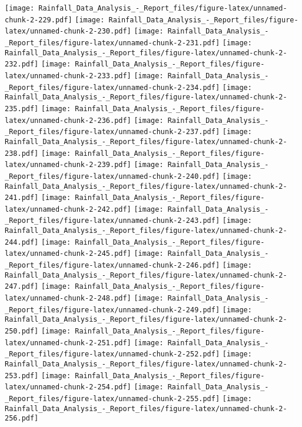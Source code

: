 \documentclass[
]{article}
\begin{document}
\texttt{[image: Rainfall\_Data\_Analysis\_-\_Report\_files/figure-latex/unnamed-chunk-2-229.pdf]}
\texttt{[image: Rainfall\_Data\_Analysis\_-\_Report\_files/figure-latex/unnamed-chunk-2-230.pdf]}
\texttt{[image: Rainfall\_Data\_Analysis\_-\_Report\_files/figure-latex/unnamed-chunk-2-231.pdf]}
\texttt{[image: Rainfall\_Data\_Analysis\_-\_Report\_files/figure-latex/unnamed-chunk-2-232.pdf]}
\texttt{[image: Rainfall\_Data\_Analysis\_-\_Report\_files/figure-latex/unnamed-chunk-2-233.pdf]}
\texttt{[image: Rainfall\_Data\_Analysis\_-\_Report\_files/figure-latex/unnamed-chunk-2-234.pdf]}
\texttt{[image: Rainfall\_Data\_Analysis\_-\_Report\_files/figure-latex/unnamed-chunk-2-235.pdf]}
\texttt{[image: Rainfall\_Data\_Analysis\_-\_Report\_files/figure-latex/unnamed-chunk-2-236.pdf]}
\texttt{[image: Rainfall\_Data\_Analysis\_-\_Report\_files/figure-latex/unnamed-chunk-2-237.pdf]}
\texttt{[image: Rainfall\_Data\_Analysis\_-\_Report\_files/figure-latex/unnamed-chunk-2-238.pdf]}
\texttt{[image: Rainfall\_Data\_Analysis\_-\_Report\_files/figure-latex/unnamed-chunk-2-239.pdf]}
\texttt{[image: Rainfall\_Data\_Analysis\_-\_Report\_files/figure-latex/unnamed-chunk-2-240.pdf]}
\texttt{[image: Rainfall\_Data\_Analysis\_-\_Report\_files/figure-latex/unnamed-chunk-2-241.pdf]}
\texttt{[image: Rainfall\_Data\_Analysis\_-\_Report\_files/figure-latex/unnamed-chunk-2-242.pdf]}
\texttt{[image: Rainfall\_Data\_Analysis\_-\_Report\_files/figure-latex/unnamed-chunk-2-243.pdf]}
\texttt{[image: Rainfall\_Data\_Analysis\_-\_Report\_files/figure-latex/unnamed-chunk-2-244.pdf]}
\texttt{[image: Rainfall\_Data\_Analysis\_-\_Report\_files/figure-latex/unnamed-chunk-2-245.pdf]}
\texttt{[image: Rainfall\_Data\_Analysis\_-\_Report\_files/figure-latex/unnamed-chunk-2-246.pdf]}
\texttt{[image: Rainfall\_Data\_Analysis\_-\_Report\_files/figure-latex/unnamed-chunk-2-247.pdf]}
\texttt{[image: Rainfall\_Data\_Analysis\_-\_Report\_files/figure-latex/unnamed-chunk-2-248.pdf]}
\texttt{[image: Rainfall\_Data\_Analysis\_-\_Report\_files/figure-latex/unnamed-chunk-2-249.pdf]}
\texttt{[image: Rainfall\_Data\_Analysis\_-\_Report\_files/figure-latex/unnamed-chunk-2-250.pdf]}
\texttt{[image: Rainfall\_Data\_Analysis\_-\_Report\_files/figure-latex/unnamed-chunk-2-251.pdf]}
\texttt{[image: Rainfall\_Data\_Analysis\_-\_Report\_files/figure-latex/unnamed-chunk-2-252.pdf]}
\texttt{[image: Rainfall\_Data\_Analysis\_-\_Report\_files/figure-latex/unnamed-chunk-2-253.pdf]}
\texttt{[image: Rainfall\_Data\_Analysis\_-\_Report\_files/figure-latex/unnamed-chunk-2-254.pdf]}
\texttt{[image: Rainfall\_Data\_Analysis\_-\_Report\_files/figure-latex/unnamed-chunk-2-255.pdf]}
\texttt{[image: Rainfall\_Data\_Analysis\_-\_Report\_files/figure-latex/unnamed-chunk-2-256.pdf]}
\end{document}
